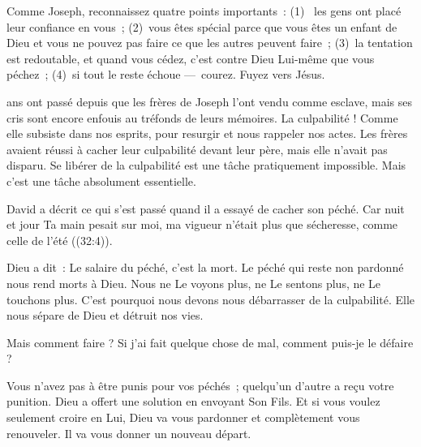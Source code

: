 Comme Joseph, reconnaissez quatre points importants~:
 (1)~ les gens ont placé leur confiance en vous~;
 (2)~vous êtes spécial parce que vous êtes un enfant de Dieu
  et vous ne pouvez pas faire ce que les autres peuvent faire~;
 (3)~la tentation est redoutable, et quand vous cédez,
  c'est contre Dieu Lui-même que vous péchez~;
 (4)~si tout le reste échoue ---~courez. Fuyez vers Jésus.

\dvrule






 ans ont passé depuis que les frères de Joseph
 l'ont vendu comme esclave, mais ses cris sont encore enfouis
 au tréfonds de leurs mémoires. La culpabilité !
 Comme elle subsiste dans nos esprits, pour resurgir
 et nous rappeler nos actes.
 Les frères avaient réussi à cacher leur culpabilité devant leur père,
 mais elle n'avait pas disparu.
 Se libérer de la culpabilité est une tâche pratiquement impossible.
 Mais c'est une tâche absolument essentielle. 


David a décrit ce qui s'est passé quand il a essayé de cacher son péché.
 \og Car nuit et jour Ta main pesait sur moi,
 ma vigueur n'était plus que sécheresse, comme celle de l'été \fg{}
 ((32:4)). 

Dieu a dit~: \og Le salaire du péché, c'est la mort. \fg{}
 Le péché qui reste non pardonné nous rend morts à Dieu.
 Nous ne Le voyons plus, ne Le sentons plus, ne Le touchons plus.
 C'est pourquoi nous devons nous débarrasser de la culpabilité.
 Elle nous sépare de Dieu et détruit nos vies. 

Mais comment faire ? Si j'ai fait quelque chose de mal,
 comment puis-je le \og défaire \fg{} ? 

Vous n'avez pas à être punis pour vos péchés~;
 quelqu'un d'autre a reçu votre punition.
 Dieu a offert une solution en envoyant Son Fils.
 Et si vous voulez seulement croire en Lui,
 Dieu va vous pardonner et complètement vous renouveler.
 Il va vous donner un nouveau départ.

